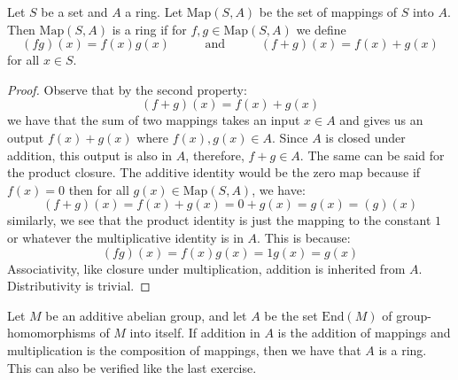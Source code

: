 \documentclass{report}
\begin{document}
\begin{examples}
    \begin{example}
        Let $S$ be a set and $A$ a ring. Let $\text{Map}(S, A)$ be the set of mappings of $S$ into $A$. Then $\text{Map}(S, A)$ is a ring if for $f, g \in \text{Map}(S, A)$ we define
            \begin{equation*}
                (fg)(x) = f(x)g(x) \hspace{30pt} \text{ and } \hspace{30pt} (f + g)(x) = f(x) + g(x)
            \end{equation*}
        for all $x \in S$.
            \begin{proof}
                Observe that by the second property:
                    \begin{equation*}
                        (f + g)(x) = f(x) + g(x)
                    \end{equation*}
                we have that the sum of two mappings takes an input $x \in A$ and gives us an output $f(x) + g(x)$ where $f(x), g(x) \in A$. Since $A$ is closed under addition, this output is also in $A$, therefore, $f + g \in A$. The same can be said for the product closure. The additive identity would be the zero map because if $f(x) = 0$ then for all $g(x) \in \text{Map}(S, A)$, we have:
                    \begin{equation*}
                        (f + g)(x) = f(x) + g(x) = 0 + g(x) = g(x) = (g)(x)
                    \end{equation*}
                similarly, we see that the product identity is just the mapping to the constant $1$ or whatever the multiplicative identity is in $A$. This is because:
                    \begin{equation*}
                        (fg)(x) = f(x)g(x) = 1g(x) = g(x)
                    \end{equation*}
                Associativity, like closure under multiplication, addition is inherited from $A$. Distributivity is trivial.
            \end{proof}
    \end{example}

    \begin{example}
        Let $M$ be an additive abelian group, and let $A$ be the set $\text{End}(M)$ of group-homomorphisms of $M$ into itself. If addition in $A$ is the addition of mappings and multiplication is the composition of mappings, then we have that $A$ is a ring. This can also be verified like the last exercise.
    \end{example}


\end{examples}
\end{document}

